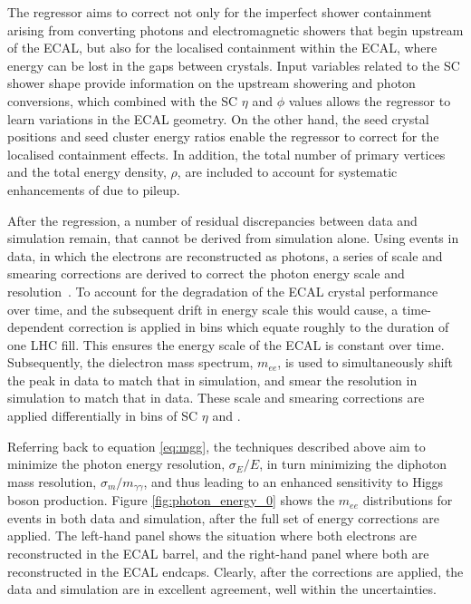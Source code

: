 The regressor aims to correct not only for the imperfect shower containment arising from converting photons and electromagnetic showers that begin upstream of the ECAL, but also for the localised containment within the ECAL, where energy can be lost in the gaps between crystals. Input variables related to the SC shower shape provide information on the upstream showering and photon conversions, which combined with the SC $\eta$ and $\phi$ values allows the regressor to learn variations in the ECAL geometry. On the other hand, the seed crystal positions and seed cluster energy ratios enable the regressor to correct for the localised containment effects. In addition, the total number of primary vertices and the total energy density, $\rho$, are included to account for systematic enhancements of \Eraw due to pileup.

After the regression, a number of residual discrepancies between data and simulation remain, that cannot be derived from simulation alone. Using \Zee events in data, in which the electrons are reconstructed as photons, a series of scale and smearing corrections are derived to correct the photon energy scale and resolution~\cite{}. To account for the degradation of the ECAL crystal performance over time, and the subsequent drift in energy scale this would cause, a time-dependent correction is applied in bins which equate roughly to the duration of one LHC fill. This ensures the energy scale of the ECAL is constant over time. Subsequently, the dielectron mass spectrum, $m_{ee}$, is used to simultaneously shift the peak in data to match that in simulation, and smear the resolution in simulation to match that in data. These scale and smearing corrections are applied differentially in bins of SC $\eta$ and \RNINE. 

Referring back to equation \ref{eq:mgg}, the techniques described above aim to minimize the photon energy resolution, $\sigma_E/E$, in turn minimizing the diphoton mass resolution, $\sigma_m/m_{\gamma\gamma}$, and thus leading to an enhanced sensitivity to Higgs boson production. Figure \ref{fig:photon_energy_0} shows the $m_{ee}$ distributions for \Zee events in both data and simulation, after the full set of energy corrections are applied. The left-hand panel shows the situation where both electrons are reconstructed in the ECAL barrel, and the right-hand panel where both are reconstructed in the ECAL endcaps. Clearly, after the corrections are applied, the data and simulation are in excellent agreement, well within the uncertainties.

